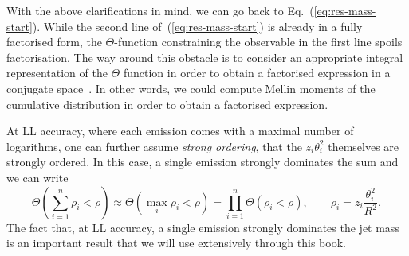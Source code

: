 With the above clarifications in mind, we can go back to Eq.~(\ref{eq:res-mass-start}).
%
While the second line of~(\ref{eq:res-mass-start}) is already in a
fully factorised form, the $\Theta$-function constraining the
observable in the first line spoils factorisation. The way around this
obstacle is to consider an appropriate integral representation of the
$\Theta$ function in order to obtain a factorised expression in a
conjugate space~\cite{Catani:1991kz,Catani:1992ua}. In other words, we
could compute Mellin moments of the cumulative distribution in order
to obtain a factorised expression.

%
At LL accuracy, where each emission comes with a maximal number of
logarithms, one can further assume {\em strong ordering}, \ie that the
$z_i\theta_i^2$ themselves are strongly ordered.
%
In this case, a single emission strongly dominates the sum and we
can write
%
\begin{equation}\label{eq:strong-rho-ordering-LL}
  \Theta \left(\sum_{i=1}^n \rho_i < \rho \right)
  \approx \Theta \left(\max_{i} \rho_i < \rho \right)
  =\prod_{i=1}^n \Theta \left( \rho_i < \rho \right), \qquad \rho_i =  z_i \frac{\theta_i^2}{R^2},
\end{equation}
The fact that, at LL accuracy, a single emission strongly dominates
the jet mass is an important result that we will use extensively
through this book.


